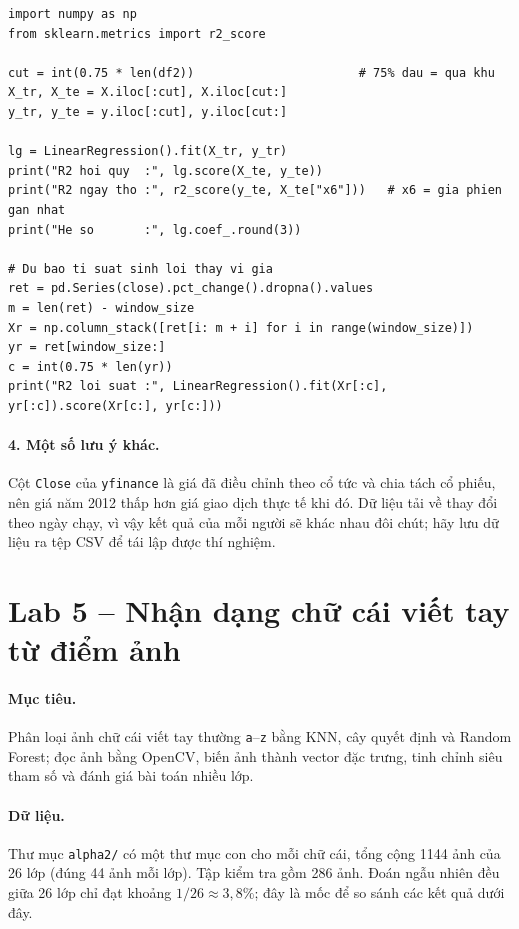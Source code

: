 \begin{lstlisting}[caption={Lab 4 -- đánh giá đúng: chia theo thời gian và so sánh với mô hình ngây thơ}]
import numpy as np
from sklearn.metrics import r2_score

cut = int(0.75 * len(df2))                       # 75% dau = qua khu
X_tr, X_te = X.iloc[:cut], X.iloc[cut:]
y_tr, y_te = y.iloc[:cut], y.iloc[cut:]

lg = LinearRegression().fit(X_tr, y_tr)
print("R2 hoi quy  :", lg.score(X_te, y_te))
print("R2 ngay tho :", r2_score(y_te, X_te["x6"]))   # x6 = gia phien gan nhat
print("He so       :", lg.coef_.round(3))

# Du bao ti suat sinh loi thay vi gia
ret = pd.Series(close).pct_change().dropna().values
m = len(ret) - window_size
Xr = np.column_stack([ret[i: m + i] for i in range(window_size)])
yr = ret[window_size:]
c = int(0.75 * len(yr))
print("R2 loi suat :", LinearRegression().fit(Xr[:c], yr[:c]).score(Xr[c:], yr[c:]))
\end{lstlisting}

\paragraph{4. Một số lưu ý khác.} Cột \texttt{Close} của \texttt{yfinance} là giá đã điều chỉnh theo cổ tức và chia tách cổ phiếu, nên giá năm 2012 thấp hơn giá giao dịch thực tế khi đó. Dữ liệu tải về thay đổi theo ngày chạy, vì vậy kết quả của mỗi người sẽ khác nhau đôi chút; hãy lưu dữ liệu ra tệp CSV để tái lập được thí nghiệm.

\section{Lab 5 -- Nhận dạng chữ cái viết tay từ điểm ảnh}
\label{sec:lab-handwriting}

\paragraph{Mục tiêu.} Phân loại ảnh chữ cái viết tay thường \texttt{a}--\texttt{z} bằng KNN, cây quyết định và Random Forest; đọc ảnh bằng OpenCV, biến ảnh thành vector đặc trưng, tinh chỉnh siêu tham số và đánh giá bài toán nhiều lớp.

\paragraph{Dữ liệu.} Thư mục \texttt{alpha2/} có một thư mục con cho mỗi chữ cái, tổng cộng 1144 ảnh của 26 lớp (đúng 44 ảnh mỗi lớp). Tập kiểm tra gồm 286 ảnh. Đoán ngẫu nhiên đều giữa 26 lớp chỉ đạt khoảng $1/26 \approx 3{,}8\%$; đây là mốc để so sánh các kết quả dưới đây.

